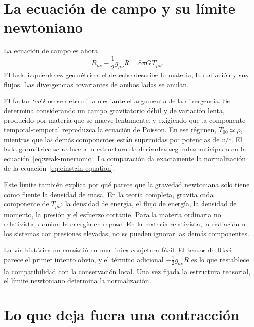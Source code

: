\section{La ecuación de campo y su límite newtoniano}

La ecuación de campo es ahora
\begin{equation}
 \boxed{
 R_{\mu\nu}-\frac12 g_{\mu\nu}R
 =
 8\pi G\,T_{\mu\nu}
 }.
 \label{eq:einstein-equation}
\end{equation}
El lado izquierdo es geométrico; el derecho describe la materia, la radiación y sus flujos. Las divergencias covariantes de ambos lados se anulan.

El factor \(8\pi G\) no se determina mediante el argumento de la divergencia. Se determina considerando un campo gravitatorio débil y de variación lenta, producido por materia que se mueve lentamente, y exigiendo que la componente temporal-temporal reproduzca la ecuación de Poisson. En ese régimen, \(T_{00}\simeq\rho\), mientras que las demás componentes están suprimidas por potencias de \(v/c\). El lado geométrico se reduce a la estructura de derivadas segundas anticipada en la ecuación~\eqref{eq:weak-mnemonic}. La comparación da exactamente la normalización de la ecuación~\eqref{eq:einstein-equation}.

Este límite también explica por qué parece que la gravedad newtoniana solo tiene como fuente la densidad de masa. En la teoría completa, gravita cada componente de \(T_{\mu\nu}\): la densidad de energía, el flujo de energía, la densidad de momento, la presión y el esfuerzo cortante. Para la materia ordinaria no relativista, domina la energía en reposo. En la materia relativista, la radiación o los sistemas con presiones elevadas, no se pueden ignorar las demás componentes.

La vía histórica no consistió en una única conjetura fácil. El tensor de Ricci parece el primer intento obvio, y el término adicional \(-\tfrac12g_{\mu\nu}R\) es lo que restablece la compatibilidad con la conservación local. Una vez fijada la estructura tensorial, el límite newtoniano determina la normalización.

\section{Lo que deja fuera una contracción}

\begin{classroomqa}
\end{classroomqa}

